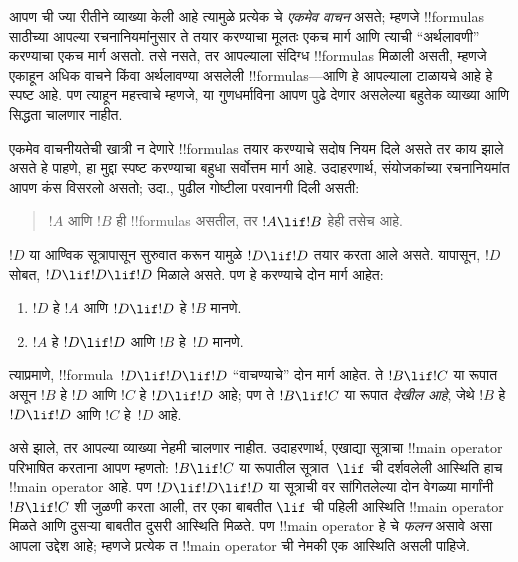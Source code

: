 \documentclass[../../../include/open-logic-section]{subfiles}
\begin{document}


\begin{explain}
आपण ची ज्या रीतीने व्याख्या केली आहे त्यामुळे प्रत्येक
चे \emph{एकमेव वाचन} असते; म्हणजे !!{formula}s साठीच्या
आपल्या रचनानियमांनुसार ते तयार करण्याचा मूलतः एकच मार्ग आणि त्याची
``अर्थलावणी'' करण्याचा एकच मार्ग असतो. तसे नसते, तर आपल्याला संदिग्ध
!!{formula}s मिळाली असती, म्हणजे एकाहून अधिक वाचने किंवा अर्थलावण्या
असलेली !!{formula}s---आणि हे आपल्याला टाळायचे आहे हे स्पष्ट आहे. पण
त्याहून महत्त्वाचे म्हणजे, या गुणधर्माविना आपण पुढे देणार असलेल्या
बहुतेक व्याख्या आणि सिद्धता चालणार नाहीत.

एकमेव वाचनीयतेची खात्री न देणारे !!{formula}s तयार करण्याचे सदोष नियम
दिले असते तर काय झाले असते हे पाहणे, हा मुद्दा स्पष्ट करण्याचा बहुधा
सर्वोत्तम मार्ग आहे. उदाहरणार्थ, संयोजकांच्या रचनानियमांत आपण कंस
विसरलो असतो; उदा., पुढील गोष्टीला परवानगी दिली असती:
\begin{quote}
$!A$ आणि $!B$ ही !!{formula}s असतील, तर $!A \lif !B$ हेही तसेच आहे.
\end{quote}
$!D$ या आण्विक सूत्रापासून सुरुवात करून यामुळे $!D \lif !D$ तयार करता
आले असते. यापासून, $!D$ सोबत, $!D \lif !D \lif !D$ मिळाले असते. पण
हे करण्याचे दोन मार्ग आहेत:
\begin{enumerate}
\item $!D$ हे $!A$ आणि $!D \lif !D$ हे $!B$ मानणे.
\item $!A$ हे $!D \lif !D$ आणि $!B$ हे~$!D$ मानणे.
\end{enumerate}
त्याप्रमाणे, !!{formula}~$!D \lif !D \lif !D$ ``वाचण्याचे'' दोन मार्ग
आहेत. ते $!B \lif !C$ या रूपात असून $!B$ हे $!D$ आणि $!C$ हे $!D
\lif !D$ आहे; पण ते $!B \lif !C$ या रूपात \emph{देखील आहे}, जेथे $!B$
हे $!D \lif !D$ आणि $!C$ हे~$!D$ आहे.

असे झाले, तर आपल्या व्याख्या नेहमी चालणार नाहीत. उदाहरणार्थ, एखाद्या
सूत्राचा !!{main operator} परिभाषित करताना आपण म्हणतो: $!B \lif !C$
या रूपातील सूत्रात~$\lif$ ची दर्शवलेली आस्थिति हाच !!{main operator}
आहे. पण $!D \lif !D \lif !D$ या सूत्राची वर सांगितलेल्या दोन वेगळ्या
मार्गांनी $!B \lif !C$ शी जुळणी करता आली, तर एका बाबतीत $\lif$ ची
पहिली आस्थिति !!{main operator} मिळते आणि दुसऱ्या बाबतीत दुसरी
आस्थिति मिळते. पण !!{main operator} हे चे \emph{फलन} असावे
असा आपला उद्देश आहे; म्हणजे प्रत्येक त !!{main
  operator} ची नेमकी एक आस्थिति असली पाहिजे.
\end{explain}
\end{document}
